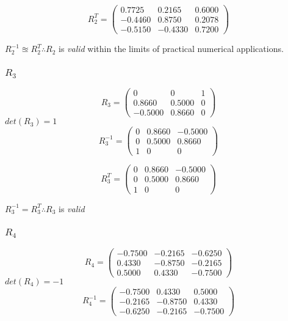 			$$
			R_{2}^{T} =
			\begin{pmatrix}
				0.7725 & 0.2165 & 0.6000\\
				-0.4460 & 0.8750 & 0.2078\\
				-0.5150  & -0.4330  & 0.7200
			\end{pmatrix}
			$$
			
			$R_{2}^{-1} \approxeq R_{2}^{T}\therefore R_{2}$ is \emph{valid} within the limits of practical numerical applications.
			
		\subsubsection{$R_{3}$}
			$$
			R_{3} =
			\begin{pmatrix}
				0 & 0 & 1\\
				0.8660 & 0.5000 & 0\\
				-0.5000  & 0.8660  & 0
			\end{pmatrix}
			$$
			\hspace{35mm}$det(R_{3}) = 1$
			\\
			$$
			R_{3}^{-1} =
			\begin{pmatrix}
				0 & 0.8660 & -0.5000\\
				0 & 0.5000 & 0.8660\\
				1  & 0  & 0
			\end{pmatrix}
			$$
		
			$$
			R_{3}^{T} =
			\begin{pmatrix}
				0 & 0.8660 & -0.5000\\
				0 & 0.5000 & 0.8660\\
				1  & 0  & 0
			\end{pmatrix}
			$$
		
			\hspace{30mm}$R_{3}^{-1} = R_{3}^{T}\therefore R_{3}$ is \emph{valid}
				
		\subsubsection{$R_{4}$}
			$$
			R_{4} =
			\begin{pmatrix}
				-0.7500 & -0.2165 & -0.6250\\
				0.4330 & -0.8750 & -0.2165\\
				0.5000  & 0.4330  & -0.7500
			\end{pmatrix}
			$$
			\hspace{35mm}$det(R_{4}) = -1$
			\\
			$$
			R_{4}^{-1} =
			\begin{pmatrix}
				-0.7500 & 0.4330 & 0.5000\\
				-0.2165 & -0.8750 & 0.4330\\
				-0.6250  & -0.2165  & -0.7500
			\end{pmatrix}
			$$
				
